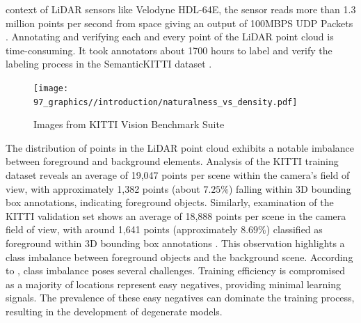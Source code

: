 context of LiDAR sensors like Velodyne HDL-64E, the sensor reads more than 1.3 million points per second from space giving an output of 100MBPS UDP Packets \parencite{velodyne_64}. Annotating and verifying each and every point of the LiDAR point cloud is time-consuming. It took annotators about 1700 hours to label and verify the labeling process in the SemanticKITTI dataset \parencite{behley2019semantickitti}.

\begin{figure}[htbp]
    \centering
    \texttt{[image: 97\_graphics//introduction/naturalness\_vs\_density.pdf]}
    \caption{Images from KITTI Vision Benchmark Suite \parencite{Geiger2012CVPR}}
    \label{fig:introduction_surf_variation_in_kitti}
\end{figure}
The distribution of points in the LiDAR point cloud exhibits a notable imbalance between foreground and background elements. Analysis of the KITTI training dataset reveals an average of 19,047 points per scene within the camera's field of view, with approximately 1,382 points (about \(7.25\%\)) falling within 3D bounding box annotations, indicating foreground objects. Similarly, examination of the KITTI validation set shows an average of 18,888 points per scene in the camera field of view, with around 1,641 points (approximately \(8.69\%\)) classified as foreground within 3D bounding box annotations \parencite{DBLP:journals/corr/abs-2004-01643}. This observation highlights a class imbalance between foreground objects and the background scene. According to \parencite{DBLP:journals/corr/abs-1708-02002}, class imbalance poses several challenges. Training efficiency is compromised as a majority of locations represent easy negatives, providing minimal learning signals. The prevalence of these easy negatives can dominate the training process, resulting in the development of degenerate models.
